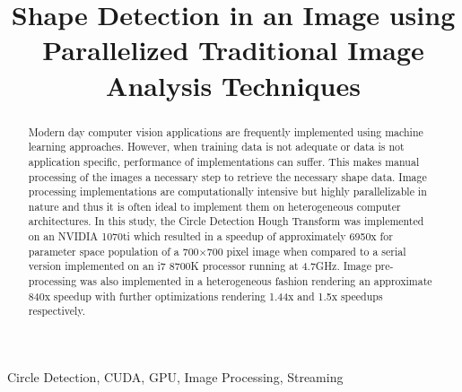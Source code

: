 \documentclass[conference]{IEEEtran}
\begin{document}
\title{Shape Detection in an Image using Parallelized Traditional Image Analysis Techniques\\
}

\author{
\and
}

\maketitle


\begin{IEEEkeywords}
  Circle Detection, CUDA, GPU, Image Processing, Streaming
\end{IEEEkeywords}

\begin{abstract}
Modern day computer vision applications are frequently implemented using machine learning approaches.
However, when training data is not adequate or data is not application specific, performance of implementations can suffer.
This makes manual processing of the images a necessary step to retrieve the necessary shape data.
Image processing implementations are computationally intensive but highly parallelizable in nature and thus it is often ideal to implement them on heterogeneous computer architectures.
In this study, the Circle Detection Hough Transform was implemented on an NVIDIA 1070ti which resulted in a speedup of approximately 6950x for parameter space population of a 700$\times$700 pixel image when compared to a serial version implemented on an i7 8700K processor running at 4.7GHz.
Image pre-processing was also implemented in a heterogeneous fashion rendering an approximate 840x speedup with further optimizations rendering 1.44x and 1.5x speedups respectively. 
\end{abstract}
\end{document}
